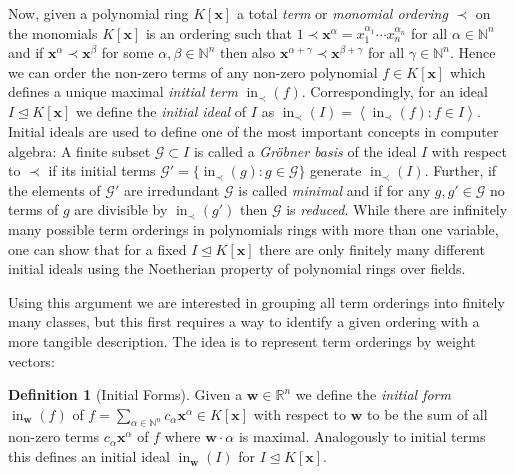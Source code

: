 \documentclass[
  paper=a4,
  DIV=14,
  fontsize=12pt,
  titlepage,
  bibliography=totoc,
  listof=totoc,
  pagesize=pdftex
]{scrartcl}
\numberwithin{figure}{section}
\numberwithin{equation}{section}
\numberwithin{table}{section}
\newcommand*\setR{\mathds{R}}
\newcommand*\setN{\mathds{N}}
\newcommand*\ideal[1]{\left\langle #1 \right\rangle}
\let\vec\mathbf
\let\idealof\trianglelefteq
\DeclareMathOperator{\initial}{in}
\theoremstyle{definition}
\newtheorem{definition}{Definition}
\numberwithin{definition}{section}
\begin{document}
Now, given a polynomial ring $K[\vec x]$ a total \emph{term} or \emph{monomial ordering}
$\prec$ on the monomials $K[\vec x]$ is an ordering such that $1 \prec \vec x^\alpha =
x_1^{\alpha_1}\cdots x_n^{\alpha_n}$ for all $\alpha \in \setN^n$ and if $\vec x^\alpha
\prec \vec x^\beta$ for some $\alpha, \beta \in \setN^n$ then also $\vec x^{\alpha+\gamma}
\prec \vec x^{\beta+\gamma}$ for all $\gamma \in \setN^n$. Hence we can order the non-zero
terms of any non-zero polynomial $f \in K[\vec x]$ which defines a unique maximal
\emph{initial term} $\initial_\prec(f)$. Correspondingly, for an ideal $I \idealof K[\vec
x]$ we define the \emph{initial ideal} of $I$ as $\initial_\prec(I) = \ideal{\initial_\prec(f)
: f \in I}$. Initial ideals are used to define one of the most important concepts in
computer algebra: A finite subset $\mathcal G \subset I$ is called a \emph{Gröbner basis}
of the ideal $I$ with respect to $\prec$ if its initial terms $\mathcal G' = \{
\initial_\prec(g) : g \in \mathcal G \}$ generate $\initial_\prec(I)$. Further, if the
elements of $\mathcal G'$ are irredundant $\mathcal G$ is called \emph{minimal} and if for
any $g, g' \in \mathcal G$ no terms of $g$ are divisible by $\initial_\prec(g')$ then
$\mathcal G$ is \emph{reduced}. While there are infinitely many possible term orderings in
polynomials rings with more than one variable, one can show that for a fixed $I \idealof
K[\vec x]$ there are only finitely many different initial ideals using the Noetherian
property of polynomial rings over fields.

Using this argument we are interested in grouping all term orderings into finitely many
classes, but this first requires a way to identify a given ordering with a more tangible
description. The idea is to represent term orderings by weight vectors:

\begin{definition}[Initial Forms]
  Given a $\vec w \in \setR^n$ we define the \emph{initial form} $\initial_{\vec w}(f)$ of
  $f = \sum_{\alpha\in\setN^n} c_\alpha \vec x^\alpha \in K[\vec x]$ with respect to $\vec
  w$ to be the sum of all non-zero terms $c_\alpha \vec x^\alpha$ of $f$ where $\vec
  w\cdot \alpha$ is maximal. Analogously to initial terms this defines an initial ideal
  $\initial_{\vec w}(I)$ for $I \idealof K[\vec x]$.
  \label{def:initFormG}
\end{definition}
\end{document}
